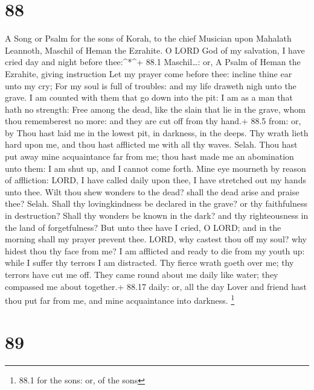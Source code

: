 \hypertarget{section-87}{%
\section{88}\label{section-87}}

A Song or Psalm for the sons of Korah, to the chief Musician upon
Mahalath Leannoth, Maschil of Heman the Ezrahite.  O LORD
God of my salvation, I have cried day and night before thee:\^{}*\^{}+
88.1 Maschil\ldots: or, A Psalm of Heman the Ezrahite, giving
instruction  Let my prayer come before thee: incline thine
ear unto my cry;  For my soul is full of troubles: and my
life draweth nigh unto the grave.  I am counted with them
that go down into the pit: I am as a man that hath no strength:
 Free among the dead, like the slain that lie in the grave,
whom thou rememberest no more: and they are cut off from thy hand.+ 88.5
from: or, by  Thou hast laid me in the lowest pit, in
darkness, in the deeps.  Thy wrath lieth hard upon me, and
thou hast afflicted me with all thy waves. Selah.  Thou hast
put away mine acquaintance far from me; thou hast made me an abomination
unto them: I am shut up, and I cannot come forth.  Mine eye
mourneth by reason of affliction: LORD, I have called daily upon thee, I
have stretched out my hands unto thee.  Wilt thou shew
wonders to the dead? shall the dead arise and praise thee? Selah.
 Shall thy lovingkindness be declared in the grave? or thy
faithfulness in destruction?  Shall thy wonders be known in
the dark? and thy righteousness in the land of forgetfulness?
 But unto thee have I cried, O LORD; and in the morning
shall my prayer prevent thee.  LORD, why castest thou off
my soul? why hidest thou thy face from me?  I am afflicted
and ready to die from my youth up: while I suffer thy terrors I am
distracted.  Thy fierce wrath goeth over me; thy terrors
have cut me off.  They came round about me daily like
water; they compassed me about together.+ 88.17 daily: or, all the day
 Lover and friend hast thou put far from me, and mine
acquaintance into darkness. \footnote{88.1 for the sons: or, of the sons}

\hypertarget{section-88}{%
\section{89}\label{section-88}}

